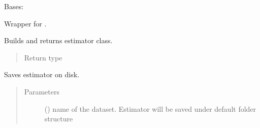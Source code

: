 \documentclass[letterpaper,10pt,english]{sphinxmanual}
\begin{document}

\begin{fulllineitems}
\label{\detokenize{estimators:mleap.estimators.bayes_estimators.Gaussian_Naive_Bayes}}
Bases: {\hyperref[\detokenize{estimators:mleap.estimators.mleap_estimator.MleapEstimator}]{}}

Wrapper for .

\begin{fulllineitems}
\label{\detokenize{estimators:mleap.estimators.bayes_estimators.Gaussian_Naive_Bayes.build}}
Builds and returns estimator class.
\begin{quote}\begin{description}
\item[{Return type}] \leavevmode
{}

\end{description}\end{quote}

\end{fulllineitems}


\begin{fulllineitems}
\label{\detokenize{estimators:mleap.estimators.bayes_estimators.Gaussian_Naive_Bayes.save}}
Saves estimator on disk.
\begin{quote}\begin{description}
\item[{Parameters}] \leavevmode
{} () \textendash{} name of the dataset. Estimator will be saved under default folder structure 

\end{description}\end{quote}

\end{fulllineitems}


\end{fulllineitems}
\end{document}
